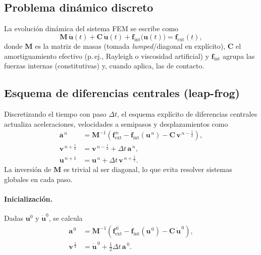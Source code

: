 \documentclass[11pt]{article} %
\begin{document}
\subsection{Problema dinámico discreto}
La evolución dinámica del sistema FEM se escribe como
\begin{equation}
  \mathbf{M}\,\ddot{\mathbf{u}}(t) + \mathbf{C}\,\dot{\mathbf{u}}(t) + \mathbf{f}_{\mathrm{int}}\!\big(\mathbf{u}(t)\big)
  = \mathbf{f}_{\mathrm{ext}}(t),
  \label{eq:semi-discreto}
\end{equation}
donde $\mathbf{M}$ es la matriz de masas (tomada \emph{lumped}/diagonal en explícito), $\mathbf{C}$ el amortiguamiento efectivo (p.\,ej., Rayleigh o viscosidad artificial) y $\mathbf{f}_{\mathrm{int}}$ agrupa las fuerzas internas (constitutivas) y, cuando aplica, las de contacto.

\subsection{Esquema de diferencias centrales (leap-frog)}
Discretizando el tiempo con paso $\Delta t$, el esquema explícito de diferencias centrales actualiza aceleraciones, velocidades a semipasos y desplazamientos como
\begin{align}
  \mathbf{a}^{\,n} &= \mathbf{M}^{-1}\!\left(\mathbf{f}_{\mathrm{ext}}^{\,n}
  - \mathbf{f}_{\mathrm{int}}\!\left(\mathbf{u}^{\,n}\right)
  - \mathbf{C}\,\mathbf{v}^{\,n-\frac{1}{2}}\right), \label{eq:accel}\\[2mm]
  \mathbf{v}^{\,n+\frac{1}{2}} &= \mathbf{v}^{\,n-\frac{1}{2}} + \Delta t\,\mathbf{a}^{\,n}, \label{eq:vel}\\[2mm]
  \mathbf{u}^{\,n+1} &= \mathbf{u}^{\,n} + \Delta t\,\mathbf{v}^{\,n+\frac{1}{2}}. \label{eq:disp}
\end{align}
La inversión de $\mathbf{M}$ es trivial al ser diagonal, lo que evita resolver sistemas globales en cada paso.

\paragraph{Inicialización.}
Dadas $\mathbf{u}^0$ y $\dot{\mathbf{u}}^0$, se calcula
\begin{align}
  \mathbf{a}^{\,0} &= \mathbf{M}^{-1}\!\left(\mathbf{f}_{\mathrm{ext}}^{\,0}
  - \mathbf{f}_{\mathrm{int}}\!\left(\mathbf{u}^{\,0}\right)
  - \mathbf{C}\,\dot{\mathbf{u}}^{\,0}\right),\\
  \mathbf{v}^{\,\frac{1}{2}} &= \dot{\mathbf{u}}^{\,0} + \tfrac{1}{2}\Delta t\,\mathbf{a}^{\,0}.
\end{align}
\end{document}
